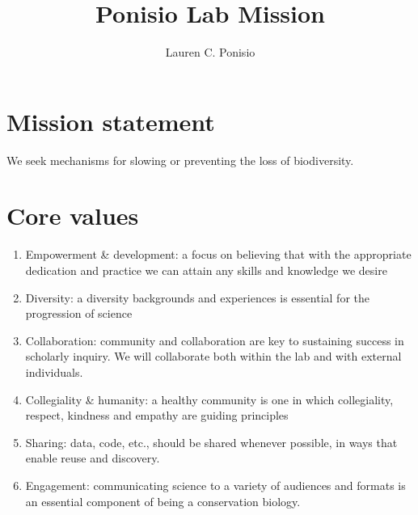 \documentclass[12pt]{article}
\title{Ponisio Lab Mission}
\author{Lauren C. Ponisio}
\begin{document}
\maketitle

\section{Mission statement}
We seek mechanisms for slowing or preventing the loss of biodiversity.

\section{Core values}

\begin{enumerate}
\item Empowerment \& development: a focus on believing that with the
  appropriate dedication and practice we can attain any skills and
  knowledge we desire
\item Diversity: a diversity backgrounds and experiences is essential
  for the progression of science
\item Collaboration: community and collaboration are key to sustaining
  success in scholarly inquiry. We will collaborate both within the
  lab and with external individuals.
\item Collegiality \& humanity: a healthy community is one in which
  collegiality, respect, kindness and empathy are guiding principles
\item Sharing: data, code, etc., should be shared whenever possible,
  in ways that enable reuse and discovery.
\item Engagement: communicating science to a variety of audiences and
  formats is an essential component of being a conservation biology.
\end{enumerate}
\end{document}
